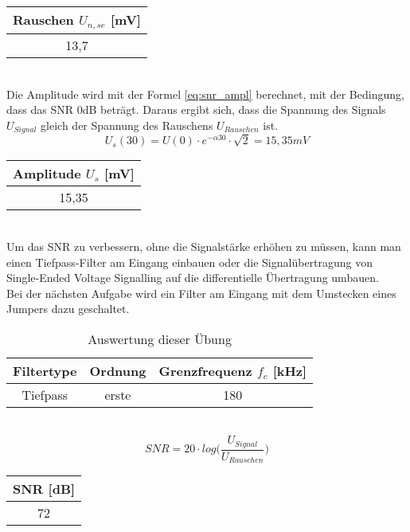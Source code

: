 \begin{table}[!h]
	\centering
	\begin{tabular}{|c|}
		\hline 
		Rauschen $U_{n, se}$ [mV]		\\ 
		\hline 
		13,7	\\ 
		\hline 
	\end{tabular}
\end{table}
~\\
Die Amplitude wird mit der Formel \ref{eq:snr_ampl} berechnet, mit der Bedingung, dass das SNR 0dB beträgt. Daraus ergibt sich, dass die Spannung des Signals $U_{Signal}$ gleich der Spannung des Rauschens $U_{Rauschen}$ ist.
\begin{equation}
	U_s(30) = U(0) \cdot e^{-\alpha 30} \cdot \sqrt{2} = 15,35mV
	\label{eq:snr_ampl}
\end{equation}

\begin{table}[!h]
	\centering
	\begin{tabular}{|c|}
		\hline 
		Amplitude $U_s$ [mV]		\\ 
		\hline 
		15,35		\\ 
		\hline 
	\end{tabular}
\end{table}
~\\
Um das SNR zu verbessern, ohne die Signalstärke erhöhen zu müssen, kann man einen Tiefpass-Filter am Eingang einbauen oder die Signalübertragung von Single-Ended Voltage Signalling auf die differentielle Übertragung umbauen.
~\\
Bei der nächsten Aufgabe wird ein Filter am Eingang mit dem Umstecken eines Jumpers dazu geschaltet.

\begin{table}[!h]
	\centering
	\begin{tabular}{|c|c|c|}
	\hline 
	Filtertype	& Ordnung		& Grenzfrequenz $f_c$ [kHz]		\\ 
	\hline 
	Tiefpass	& erste		& 180					\\ 
	\hline 
	\end{tabular}
	\caption{Auswertung dieser Übung}
\end{table}
~\\

\begin{equation}
	SNR = 20 \cdot log\bigg(\dfrac{U_{Signal}}{U_{Rauschen}}\bigg)
	\label{eq:snr_ampl}
\end{equation}
\begin{table}[!h]
	\centering
	\begin{tabular}{|c|}
		\hline 
		SNR [dB]		\\ 
		\hline 
		72		\\ 
		\hline 
	\end{tabular}
\end{table}


